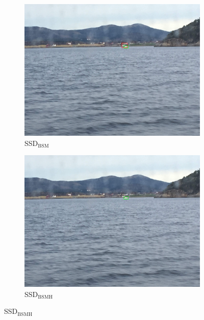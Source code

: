 \begin{figure}[h!]
\begin{subfigure}{.5\textwidth}
  \centering
  \includegraphics[width=0.8\linewidth]{results/case_buildings/ssdtrf/ssd2/2better/IMG_2459.jpg}
  \caption{SSD$_{\text{BSM}}$}
\end{subfigure}%
\begin{subfigure}{.5\textwidth}
  \centering
  \includegraphics[width=.8\linewidth]{results/case_buildings/ssdtrf/ssd3/2better/IMG_2459.jpg}
  \caption{SSD$_{\text{BSMH}}$}
\end{subfigure}


\end{figure}
